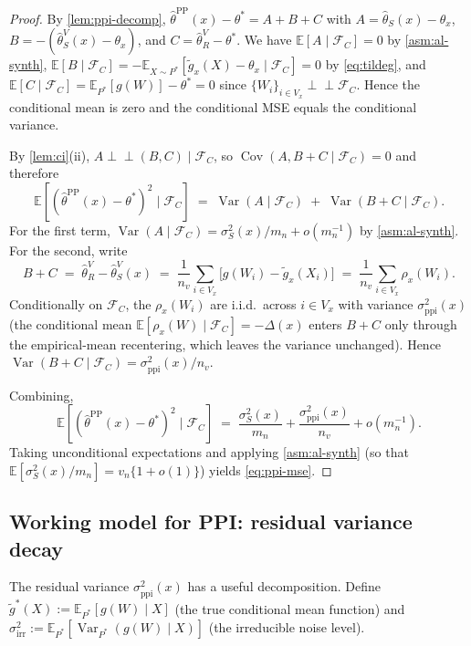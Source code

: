 \documentclass[11pt]{article}
\theoremstyle{plain}
\theoremstyle{definition}
\theoremstyle{remark}
\newcommand{\E}{\mathbb{E}}
\newcommand{\Var}{\operatorname{Var}}
\newcommand{\Cov}{\operatorname{Cov}}
\newcommand{\indep}{\perp\!\!\!\perp}
\begin{document}
\begin{proof}
By \cref{lem:ppi-decomp}, $\hat\theta^{\mathrm{PP}}(x)-\theta^*=A+B+C$ with $A=\hat\theta_S(x)-\theta_x$, $B=-(\hat\theta_S^V(x)-\theta_x)$, and $C=\hat\theta_R^V-\theta^*$. We have $\E[A\mid\mathcal{F}_C]=0$ by \cref{asm:al-synth}, $\E[B\mid\mathcal{F}_C]=-\E_{X\sim P^*}[\tilde g_x(X)-\theta_x\mid\mathcal{F}_C]=0$ by \cref{eq:tildeg}, and $\E[C\mid\mathcal{F}_C]=\E_{P^*}[g(W)]-\theta^*=0$ since $\{W_i\}_{i\in V_x}\indep\mathcal{F}_C$. Hence the conditional mean is zero and the conditional MSE equals the conditional variance.

By \cref{lem:ci}(ii), $A\indep(B,C)\mid\mathcal{F}_C$, so $\Cov(A,B+C\mid\mathcal{F}_C)=0$ and therefore
\begin{equation*}
\E[(\hat\theta^{\mathrm{PP}}(x)-\theta^*)^2\mid\mathcal{F}_C]\;=\;\Var(A\mid\mathcal{F}_C)\;+\;\Var(B+C\mid\mathcal{F}_C).
\end{equation*}
For the first term, $\Var(A\mid\mathcal{F}_C)=\sigma_S^2(x)/m_n+o(m_n^{-1})$ by \cref{asm:al-synth}. For the second, write
\begin{equation*}
B+C\;=\;\hat\theta_R^V-\hat\theta_S^V(x)\;=\;\frac{1}{n_v}\sum_{i\in V_x}\bigl[g(W_i)-\tilde g_x(X_i)\bigr]\;=\;\frac{1}{n_v}\sum_{i\in V_x}\rho_x(W_i).
\end{equation*}
Conditionally on $\mathcal{F}_C$, the $\rho_x(W_i)$ are i.i.d.\ across $i\in V_x$ with variance $\sigma_{\mathrm{ppi}}^2(x)$ (the conditional mean $\E[\rho_x(W)\mid\mathcal{F}_C]=-\Delta(x)$ enters $B+C$ only through the empirical-mean recentering, which leaves the variance unchanged). Hence
$\Var(B+C\mid\mathcal{F}_C)=\sigma_{\mathrm{ppi}}^2(x)/n_v$.

Combining,
\begin{equation*}
\E[(\hat\theta^{\mathrm{PP}}(x)-\theta^*)^2\mid\mathcal{F}_C]\;=\;\frac{\sigma_S^2(x)}{m_n}+\frac{\sigma_{\mathrm{ppi}}^2(x)}{n_v}+o(m_n^{-1}).
\end{equation*}
Taking unconditional expectations and applying \cref{asm:al-synth} (so that $\E[\sigma_S^2(x)/m_n]=v_n\{1+o(1)\}$) yields \cref{eq:ppi-mse}.
\end{proof}

\subsection{Working model for PPI: residual variance decay}
\label{ssec:ppi-working}

The residual variance $\sigma_{\mathrm{ppi}}^2(x)$ has a useful decomposition. Define $\tilde g^*(X):=\E_{P^*}[g(W)\mid X]$ (the true conditional mean function) and $\sigma_{\mathrm{irr}}^2:=\E_{P^*}[\Var_{P^*}(g(W)\mid X)]$ (the irreducible noise level).
\end{document}
